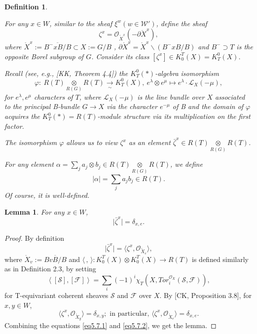 \documentclass{article}
\newtheorem{definition}[theorem]{Definition}
\newtheorem{lemma}[theorem]{Lemma}
\def\L{\mathcal{L}}
\def\W{\mathcal{W}}
\def\F{\mathcal{F}}
\def\ref#1{#1}
\begin{document}
\begin{definition}\label{5.6} \rm{
For any $x\in W$, similar to the sheaf $\xi^w\left(w\in \W'\right)$, define the sheaf 
$$
\zeta^x =\mathcal{O} _{\mathring{X}^x}\left(-\partial \mathring{X} ^x\right),
$$
where $\mathring{X}^x := \overline{B^-xB/B} \subset X:= G/B$ ,
$
\partial \mathring{X}^x = \mathring{X}^x \backslash \left( B^-xB/B\right)$ and $B^-\supset T$ is the opposite Borel subgroup of $G$.
Consider its class $\left[ \zeta^x\right]\in K_0^T (X) = K^0_T(X)$.


Recall (see, e.g., [KK, Theorem 4.4]) the $K_T^0(*)$-algebra isomorphism
$$
\varphi: ~ R(T) \underset{R(G)}{\otimes} R(T) \underset{\sim}{\rightarrow} K^0_T (X),~e^\lambda\otimes e^\mu \mapsto e^\lambda \cdot \L_X\left(-\mu\right), 
$$
for $e^\lambda, e^\mu $ characters of $T$, where $\L_X(-\mu)$ is the line bundle over $X$ associated to the principal B-bundle $G\rightarrow X$ via the character $e^{-\mu}$ of B and the domain of $\varphi$ acquires the $K_T^0(*)=R(T)$-module structure via its multiplication on the first factor. 

	
The isomorphism $\varphi$ allows us to view $\zeta^x$ as an element $\bar{\zeta}^x\in R(T) \underset{R(G)}{\otimes} R(T) $. 

For any element $\alpha=\sum_j a_j \otimes b_j \in R(T) \underset{R(G)}{\otimes} R(T)$, 
we define 
$$
\vert \alpha \vert = \sum_j a_j b_j \in R(T).
$$
Of course, it is well-defined. }
\end{definition}
\begin{lemma}\label{lem5.4}
For any $x\in W$, 
$$
\vert \bar{\zeta}^x\vert = \delta_{x,e}.
$$
\end{lemma}
\begin{proof}
By definition 
\begin{equation}\label{eq5.7.1}
\vert \bar{\zeta}^x\vert = \langle \zeta^x, \mathcal{O}_{\mathring{X}_e}\rangle,
\end{equation}
where $\mathring{X}_v:= \overline{BvB/B}$ and $\langle\,,\,\rangle: K_0^T(X)\otimes K_0^T (X) \rightarrow R(T)$ is defined similarly as in Definition \ref{2.3}, by setting 
$$
\left\langle \left[\mathcal{S}\right],\left[\F\right]\right\rangle = \sum_i (-1)^i \chi_T \left( X, Tor_i^{\mathcal{O}_X} \left(\mathcal{S},\F\right)\right),
$$
for T-equivariant coherent sheaves $\mathcal{S}$ and $\F$ over $X$. 
By [CK, Proposition 3.8], for $ x,y\in W$,
\begin{equation}\label{eq5.7.2}
\langle \zeta^x ,\mathcal{O} _{\mathring{X}_y}\rangle = \delta _{x,y}; \mbox{ in particular, } \langle \zeta ^x ,\mathcal{O} _{\mathring{X}_e}\rangle =\delta _{x,e}.
\end{equation}
Combining the equations \eqref{eq5.7.1} and \eqref{eq5.7.2}, we get the lemma.
\end{proof}
\end{document}
